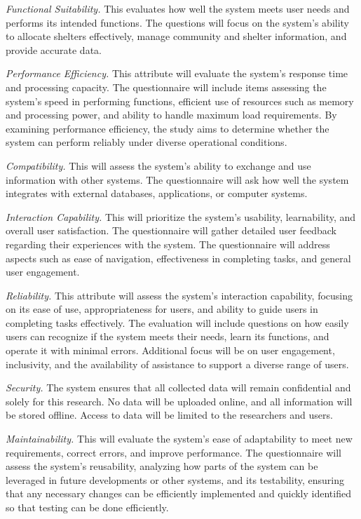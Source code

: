 	\textit{Functional Suitability.} This evaluates how well the system meets user needs and performs its intended functions. The questions will focus on the system's ability to allocate shelters effectively, manage community and shelter information, and provide accurate data.
	
	\textit{Performance Efficiency.} This attribute will evaluate the system's response time and processing capacity. The questionnaire will include items assessing the system's speed in performing functions, efficient use of resources such as memory and processing power, and ability to handle maximum load requirements. By examining performance efficiency, the study aims to determine whether the system can perform reliably under diverse operational conditions.
	
	\textit{Compatibility.} This will assess the system’s ability to exchange and use information with other systems. The questionnaire will ask how well the system integrates with external databases, applications, or computer systems. 
	
	\textit{Interaction Capability.} This will prioritize the system's usability, learnability, and overall user satisfaction. The questionnaire will gather detailed user feedback regarding their experiences with the system. The questionnaire will address aspects such as ease of navigation, effectiveness in completing tasks, and general user engagement.
	
	\textit{Reliability.} This attribute will assess the system's interaction capability, focusing on its ease of use, appropriateness for users, and ability to guide users in completing tasks effectively. The evaluation will include questions on how easily users can recognize if the system meets their needs, learn its functions, and operate it with minimal errors. Additional focus will be on user engagement, inclusivity, and the availability of assistance to support a diverse range of users. 
	
	\textit{Security.} The system ensures that all collected data will remain confidential and solely for this research. No data will be uploaded online, and all information will be stored offline. Access to data will be limited to the researchers and users.
	
	\textit{Maintainability.} This will evaluate the system's ease of adaptability to meet new requirements, correct errors, and improve performance. The questionnaire will assess the system's reusability, analyzing how parts of the system can be leveraged in future developments or other systems, and its testability, ensuring that any necessary changes can be efficiently implemented and quickly identified so that testing can be done efficiently. 
	
